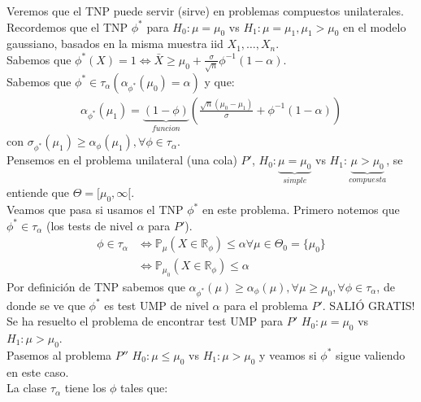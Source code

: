 \documentclass[10pt]{article}
\theoremstyle{plain}
\theoremstyle{definition}
\begin{document}
Veremos que el TNP puede servir (sirve) en problemas compuestos unilaterales.\\
Recordemos que el TNP $\phi^*$ para $H_{0}: \mu = \mu_{0}$ vs $H_{1}: \mu = \mu_{1}, \mu_{1}>\mu_{0}$ en el modelo gaussiano, basados en la misma muestra iid $X_{1},\ldots,X_{n}$.\\
Sabemos que $\phi^*(X)=1 \Leftrightarrow \bar{X} \ge \mu_{0} + \frac{\sigma}{\sqrt{n}}\phi^{-1}(1-\alpha)$.\\
Sabemos que $\phi^* \in \tau_{\alpha} (\alpha_{\phi^*}(\mu_{0}) = \alpha)$ y que:
\begin{align*}
\alpha_{\phi^*}(\mu_{1}) = \underbrace{(1-\phi)}_{funcion} \left(\frac{\sqrt{n}(\mu_{0}-\mu_{1})}{\sigma}+ \phi^{-1}(1-\alpha)\right)
\end{align*}
con $\sigma_{\phi^*}(\mu_{1}) \ge \alpha_{\phi}(\mu_{1}), \forall \phi \in \tau_{\alpha}$.\\

Pensemos en el problema unilateral (una cola) $P'$, $H_{0}: \underbrace{\mu = \mu_{0}}_{simple}$ vs $H_{1}: \underbrace{\mu > \mu_{0}}_{compuesta}$, se entiende que $\Theta = [\mu_{0},\infty[$.\\
Veamos que pasa si usamos el TNP $\phi^*$ en este problema. Primero notemos que $\phi^* \in \tau_{\alpha}$ (los tests de nivel $\alpha$ para $P'$).\\
\begin{align*}
 \phi \in \tau_{\alpha} & \Leftrightarrow \mathbb{P}_{\mu}(X\in \mathbb{R}_{\phi}) \le \alpha \forall \mu \in \Theta_{0} = \{\mu_{0}\}\\
 & \Leftrightarrow \mathbb{P}_{\mu_{0}}(X\in \mathbb{R}_{\phi}) \le \alpha
\end{align*}
Por definición de TNP sabemos que $\alpha_{\phi^*}(\mu) \ge \alpha_{\phi}(\mu), \forall \mu \ge \mu_{0}, \forall \phi \in \tau_{\alpha}$, de donde se ve que $\phi^*$ es test UMP de nivel $\alpha$ para el problema $P'$. SALIÓ GRATIS!\\

Se ha resuelto el problema de encontrar test UMP para $P'$ $H_{0}: \mu=\mu_{0}$ vs $H_{1}: \mu>\mu_{0}$.\\
Pasemos al problema $P''$ $H_{0}: \mu \le \mu_{0}$ vs $H_{1}: \mu>\mu_{0}$ y veamos si $\phi^*$ sigue valiendo en este caso.\\
La clase $\tau_{\alpha}$ tiene los $\phi$ tales que:
\end{document}
